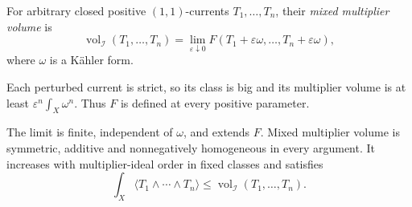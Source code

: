 \begin{definition}\label{def:mixed-multiplier-volume}
For arbitrary closed positive $(1,1)$-currents $T_1,\ldots,T_n$, their \emph{mixed multiplier volume} is
\[
 \operatorname{vol}_{\mathcal I}(T_1,\ldots,T_n)
  =\lim_{\varepsilon\downarrow0}F(T_1+\varepsilon\omega,\ldots,T_n+\varepsilon\omega),
\]
where $\omega$ is a K\"ahler form.
\end{definition}
Each perturbed current is strict, so its class is big and its multiplier volume is at least $\varepsilon^n\int_X\omega^n$. Thus $F$ is defined at every positive parameter.

\begin{proposition}\label{prop:mixed-multiplier-volume-calculus}
The limit is finite, independent of $\omega$, and extends $F$. Mixed multiplier volume is symmetric, additive and nonnegatively homogeneous in every argument. It increases with multiplier-ideal order in fixed classes and satisfies
\[
 \int_X\langle T_1\wedge\cdots\wedge T_n\rangle
                 \leq\operatorname{vol}_{\mathcal I}(T_1,\ldots,T_n).
\]
\end{proposition}
